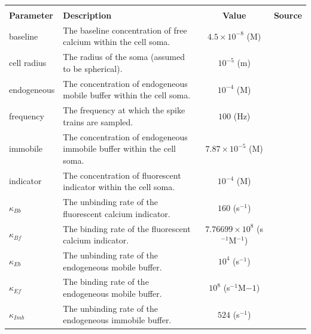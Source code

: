 \documentclass[a4paper,12pt]{article}
\theoremstyle{definition}
\begin{document}
\begin{table}[p]
  \centering
  \begin{tabular}{|l|p{6cm}|c|r|}
    \hline & & & \\
    \textbf{Parameter} & \textbf{Description} & \textbf{Value} & \textbf{Source} \\ \hline
    baseline      & The baseline concentration of free calcium within the cell soma.        & $4.5\times10^{-8}$ (M)                      & \cite{maravall} \\  \hline
    cell radius   & The radius of the soma (assumed to be spherical).                       & $10^{-5}$ (m)                               & \cite{fiala}    \\  \hline
    endogeneous   & The concentration of endogeneous mobile buffer within the cell soma.    & $10^{-4}$ (M)                               & \cite{faas}     \\  \hline
    frequency     & The frequency at which the spike trains are sampled.                    & $100$ (Hz)                                  &                 \\  \hline
    immobile      & The concentration of endogeneous immobile buffer within the cell soma.  & $7.87\times10^{-5}$ (M)                     & \cite{bartol}   \\  \hline
    indicator     & The concentration of fluorescent indicator within the cell soma.        & $10^{-4}$ (M)                               & \cite{maravall} \\  \hline
    $\kappa_{Bb}$ & The unbinding rate of the fluorescent calcium indicator.                & $160$ (s$^{-1}$)                            & \cite{bartol}   \\  \hline
    $\kappa_{Bf}$ & The binding rate of the fluorescent calcium indicator.                  & $7.76699\times10^{8}$ (s$^{-1}$M$^{-1}$)    & \cite{bartol}   \\  \hline
    $\kappa_{Eb}$ & The unbinding rate of the endogeneous mobile buffer.                    & $10^4$ (s$^{-1}$)                           & \cite{bartol}   \\  \hline
    $\kappa_{Ef}$ & The binding rate of the endogeneous mobile buffer.                      & $10^8$ (s$^{-1}$M${-1}$)                    & \cite{bartol}   \\  \hline
    $\kappa_{Imb}$& The unbinding rate of the endogeneous immobile buffer.                  & $524$ (s$^{-1}$)                            & \cite{bartol}   \\  \hline

\end{tabular}
\end{table}
\end{document}
